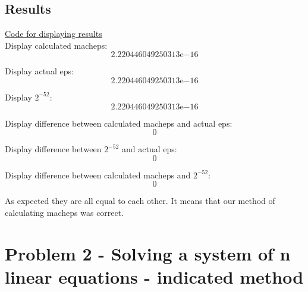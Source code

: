 \section{Results}
\hyperlink{function1_display}{Code for displaying results}\\
Display calculated macheps:
     \[2.220446049250313\mathrm{e}{-16}\]

Display actual eps:
     \[2.220446049250313\mathrm{e}{-16}\]

Display $2^{-52}$:
     \[2.220446049250313\mathrm{e}{-16}\]

Display difference between calculated macheps and actual eps:
     \[0\]

Display difference between $2^{-52}$ and actual eps:
          \[0\]

Display difference between calculated macheps and $2^{-52}$:
         \[0\]

As expected they are all equal to each other. It means that our method of calculating macheps was correct.

\chapter{Problem 2 - Solving a system of n linear equations - indicated method}

